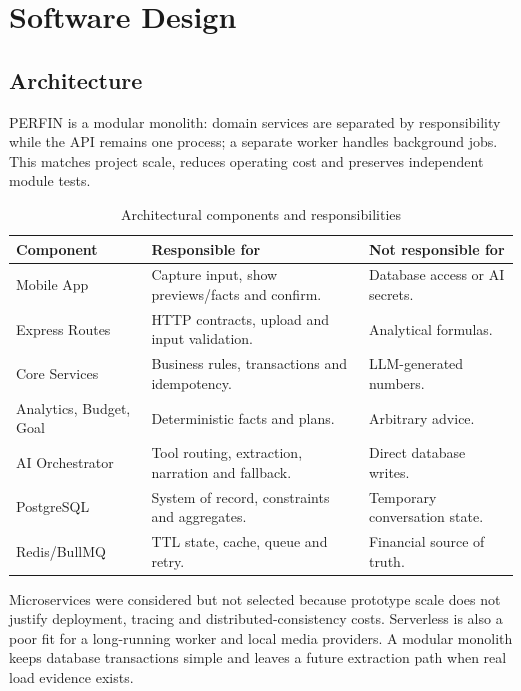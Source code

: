 \section{Software Design}

\subsection{Architecture}

PERFIN is a modular monolith: domain services are separated by responsibility while the API remains one process; a separate worker handles background jobs. This matches project scale, reduces operating cost and preserves independent module tests.


\begin{table}[H]
  \centering
  \caption{Architectural components and responsibilities}
  \label{tab:components}
  \begin{tabularx}{\textwidth}{@{}L{3.2cm}Y Y@{}}
    \toprule
    \textbf{Component} & \textbf{Responsible for} & \textbf{Not responsible for} \\
    \midrule
    Mobile App & Capture input, show previews/facts and confirm. & Database access or AI secrets. \\
    Express Routes & HTTP contracts, upload and input validation. & Analytical formulas. \\
    Core Services & Business rules, transactions and idempotency. & LLM-generated numbers. \\
    Analytics, Budget, Goal & Deterministic facts and plans. & Arbitrary advice. \\
    AI Orchestrator & Tool routing, extraction, narration and fallback. & Direct database writes. \\
    PostgreSQL & System of record, constraints and aggregates. & Temporary conversation state. \\
    Redis/BullMQ & TTL state, cache, queue and retry. & Financial source of truth. \\
    \bottomrule
  \end{tabularx}
\end{table}

Microservices were considered but not selected because prototype scale does not justify deployment, tracing and distributed-consistency costs. Serverless is also a poor fit for a long-running worker and local media providers. A modular monolith keeps database transactions simple and leaves a future extraction path when real load evidence exists.

